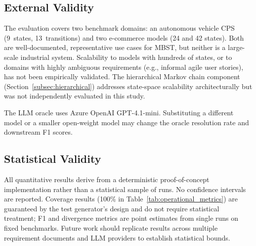\subsection{External Validity}

The evaluation covers two benchmark domains: an autonomous vehicle CPS
(9~states, 13~transitions) and two e-commerce models (24 and 42
states).  Both are well-documented, representative use cases for MBST,
but neither is a large-scale industrial system.  Scalability to models
with hundreds of states, or to domains with highly ambiguous
requirements (e.g., informal agile user stories), has not been
empirically validated.  The hierarchical Markov chain component
(Section~\ref{subsec:hierarchical}) addresses state-space scalability
architecturally but was not independently evaluated in this study.

The LLM oracle uses Azure OpenAI GPT-4.1-mini.  Substituting a
different model or a smaller open-weight model may change the oracle
resolution rate and downstream F1 scores.

\subsection{Statistical Validity}

All quantitative results derive from a deterministic proof-of-concept
implementation rather than a statistical sample of runs.  No
confidence intervals are reported.  Coverage results (100\% in
Table~\ref{tab:operational_metrics}) are guaranteed by the test
generator's design and do not require statistical treatment; F1 and
divergence metrics are point estimates from single runs on fixed
benchmarks.  Future work should replicate results across multiple
requirement documents and LLM providers to establish statistical bounds.
